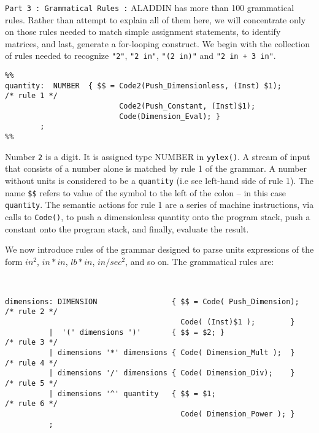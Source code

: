 \vspace{ 0.20 in}\noindent 
{\tt Part 3 : Grammatical Rules :} ALADDIN has more than 100 grammatical rules.
Rather than attempt to explain all of them here, we will concentrate only
on those rules needed to match simple assignment statements,
to identify matrices, and last, generate a for-looping construct.
We begin with the collection of rules needed to
recognize {\tt "2"}, {\tt "2 in"}, {\tt "(2 in)"} and {\tt "{2 in + 3 in}"}.

\begin{footnotesize}
\begin{verbatim}
%%
quantity:  NUMBER  { $$ = Code2(Push_Dimensionless, (Inst) $1);       /* rule 1 */
                          Code2(Push_Constant, (Inst)$1);
                          Code(Dimension_Eval); }                     
        ;
%%
\end{verbatim}
\end{footnotesize}

\vspace{0.15 in}\noindent
Number {\tt 2} is a digit. It is assigned type NUMBER in {\tt yylex()}.
A stream of input that consists of a number
alone is matched by rule 1 of the grammar.
A number without units is considered to be a
{\tt quantity} (i.e see left-hand side of rule 1).
The name {\tt \$\$} refers to value of the symbol to the left
of the colon -- in this case {\tt quantity}.
The semantic actions for rule 1 are a series of
machine instructions, via calls to {\tt Code()},
to push a dimensionless quantity onto the program stack,  
push a constant onto the program stack, and finally, evaluate the result.

\vspace{ 0.15 in}
\noindent\hspace{ 0.50 in}
We now introduce rules of the grammar designed to parse
units expressions of the form $in^2$, $in*in$, $lb*in$, $in/sec^2$, and so on.
The grammatical rules are:

\begin{footnotesize}
\begin{verbatim}


dimensions: DIMENSION                 { $$ = Code( Push_Dimension);   /* rule 2 */
                                        Code( (Inst)$1 );        }
          |  '(' dimensions ')'       { $$ = $2; }                    /* rule 3 */
          | dimensions '*' dimensions { Code( Dimension_Mult );  }    /* rule 4 */
          | dimensions '/' dimensions { Code( Dimension_Div);    }    /* rule 5 */
          | dimensions '^' quantity   { $$ = $1;                      /* rule 6 */
                                        Code( Dimension_Power ); }
          ;
\end{verbatim}
\end{footnotesize}

